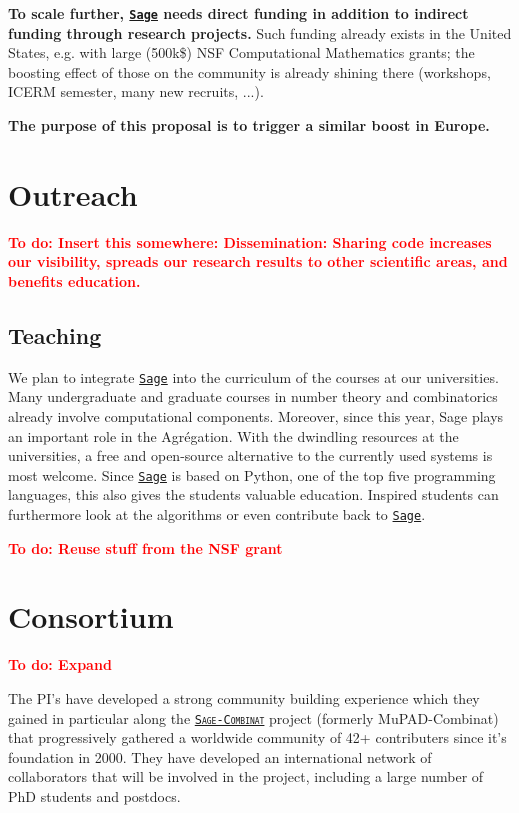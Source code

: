 \documentclass[a4,12pt]{amsart}
\newcommand{\sage}{\href{http://www.sagemath.org/}{\texttt{Sage}}\xspace}
\newcommand{\sagecombinat}{\href{http://wiki.sagemath.org/combinat/}{\texttt{Sage-Combinat}}\xspace}
\newcommand{\TODO}[2][To do: ]{{\textcolor{red}{\textbf{#1#2}}}}
\begin{document}
\textbf{To scale further, \sage needs direct funding in addition to
  indirect funding through research projects.} Such funding already
exists in the United States, e.g. with large (500k\$) NSF
Computational Mathematics grants; the boosting effect of those on the
community is already shining there (workshops, ICERM semester, many
new recruits, ...).

\medskip
\textbf{The purpose of this proposal is to trigger a similar boost in
  Europe.}

\section{Outreach}

\TODO{Insert this somewhere: Dissemination: Sharing code increases our
  visibility, spreads our research results to other scientific areas,
  and benefits education.}

\subsection{Teaching}

We plan to integrate \sage into the curriculum of the courses at our
universities. Many undergraduate and graduate courses in number theory
and combinatorics already involve computational components. Moreover,
since this year, Sage plays an important role in the Agrégation. With
the dwindling resources at the universities, a free and open-source
alternative to the currently used systems %
is most welcome. Since \sage is based on Python, one of the top five
programming languages, this also gives the students valuable
education.  Inspired students can furthermore look at the algorithms
or even contribute back to \sage.

\TODO{Reuse stuff from the NSF grant}

\section{Consortium}

\TODO{Expand}

The PI's have developed a strong community building experience which
they gained in particular along the \textsc{\sagecombinat} project
(formerly MuPAD-Combinat) that progressively gathered a worldwide
community of 42+ contributers since it's foundation in 2000. They have
developed an international network of collaborators that will be
involved in the project, including a large number of PhD students and
postdocs.
\end{document}
